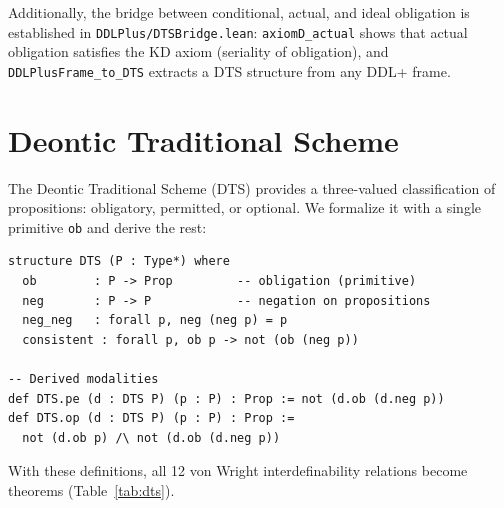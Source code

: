 \documentclass[]{article}
\newcommand{\code}[1]{\texttt{#1}}
\newcommand{\DDL}{\textup{DDL+}}
\newcommand{\DTS}{\textup{DTS}}
\begin{document}
Additionally, the bridge between conditional, actual, and ideal obligation is
established in \code{DDLPlus/DTSBridge.lean}:
\code{axiomD\_actual} shows that actual obligation satisfies the KD axiom
(seriality of obligation), and \code{DDLPlusFrame\_to\_DTS} extracts a
\DTS{} structure from any \DDL{} frame.

\section{Deontic Traditional Scheme}
\label{sec:dts}

The Deontic Traditional Scheme (\DTS{}) \cite{AlchourrónBulygin1971,vonWright1951}
provides a three-valued classification of propositions: obligatory, permitted,
or optional.
We formalize it with a single primitive \code{ob} and derive the rest:

\begin{lstlisting}
structure DTS (P : Type*) where
  ob        : P -> Prop         -- obligation (primitive)
  neg       : P -> P            -- negation on propositions
  neg_neg   : forall p, neg (neg p) = p
  consistent : forall p, ob p -> not (ob (neg p))

-- Derived modalities
def DTS.pe (d : DTS P) (p : P) : Prop := not (d.ob (d.neg p))
def DTS.op (d : DTS P) (p : P) : Prop :=
  not (d.ob p) /\ not (d.ob (d.neg p))
\end{lstlisting}

\noindent
With these definitions, all 12 von Wright interdefinability relations become
theorems (Table~\ref{tab:dts}).
\end{document}
